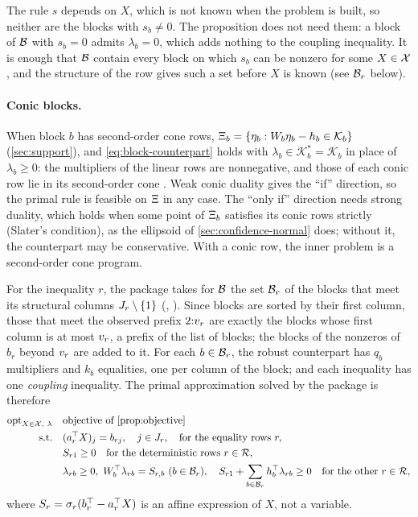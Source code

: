 The rule $s$ depends on $X$, which is not known when the problem is built, so neither are the blocks with $s_b \neq 0$.
The proposition does not need them:
a block of $\mathcal{B}$ with $s_b = 0$ admits $\lambda_b = 0$, which adds nothing to the coupling inequality.
It is enough that $\mathcal{B}$ contain every block on which $s_b$ can be nonzero for some $X \in \mathcal{X}$,
and the structure of the row gives such a set before $X$ is known (see $\mathcal{B}_r$ below).

\paragraph{Conic blocks.}
When block $b$ has second-order cone rows, $\Xi_{b} = \{\eta_b : W_b\eta_b - h_b \in \mathcal{K}_b\}$ (\cref{sec:support}),
and \eqref{eq:block-counterpart} holds with $\lambda_b \in \mathcal{K}_b^* = \mathcal{K}_b$ in place of $\lambda_b \ge 0$:
the multipliers of the linear rows are nonnegative, and those of each conic row lie in its second-order cone \citep[Theorem~2.1]{GWK2015}.
Weak conic duality gives the ``if'' direction, so the primal rule is feasible on $\Xi$ in any case.
The ``only if'' direction needs strong duality, which holds when some point of $\Xi_{b}$ satisfies its conic rows strictly (Slater's condition),
as the ellipsoid of \cref{sec:confidence-normal} does; without it, the counterpart may be conservative.
With a conic row, the inner problem is a second-order cone program.

For the inequality $r$, the package takes for $\mathcal{B}$ the set $\mathcal{B}_r$ of the blocks that meet its structural columns $J_r \setminus \{1\}$ (, ).
Since blocks are sorted by their first column, those that meet the observed prefix $2{:}v_r$ are exactly the blocks whose first column is at most $v_r$, a prefix of the list of blocks;
the blocks of the nonzeros of $b_r$ beyond $v_r$ are added to it.
For each $b \in \mathcal{B}_r$, the robust counterpart has $q_b$ multipliers and $k_b$ equalities, one per column of the block;
and each inequality has one \emph{coupling} inequality.
The primal approximation solved by the package is therefore
\begin{equation}
\label{eq:primal-lp}
\begin{aligned}
\opt_{X \in \Rules,\ \lambda} \quad & \text{objective of \cref{prop:objective}} \\
\text{s.t.} \quad & (a_r^\T X)_j = b_{rj}, \quad j \in \Jr_r, \quad \text{for the equality rows } r,\\
& S_{r1} \ge 0 \quad \text{for the deterministic rows } r \in \Rows,\\
& \lambda_{rb} \ge 0,\ W_b^\T\lambda_{rb} = S_{r,b}\ (b \in \Touch_r),\quad S_{r1} + \sum_{b\in\Touch_r} h_b^\T\lambda_{rb} \ge 0 \quad \text{for the other } r \in \Rows,
\end{aligned}
\end{equation}
where $S_r = \sigma_r(b_r^\top - a_r^\top X)$ is an affine expression of $X$, not a variable.

